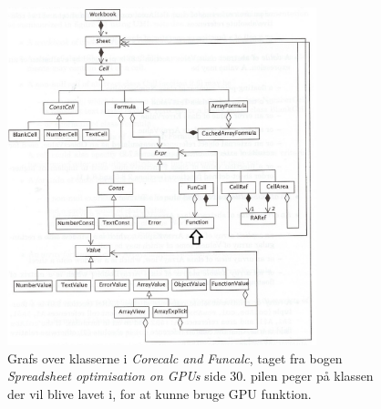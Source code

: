\begin{figure}[p]
    \centering
    \includegraphics[width=0.8\textwidth]{Content/Graphic/CorecalcClass.png}
    \caption{Grafs over klasserne i \textit{Corecalc and Funcalc}, taget fra bogen \textit{Spreadsheet optimisation on GPUs} \cite{GPUP} side 30. pilen peger på klassen der vil blive lavet i, for at kunne bruge GPU funktion.}
    \label{fig:corecalc_class}
\end{figure}